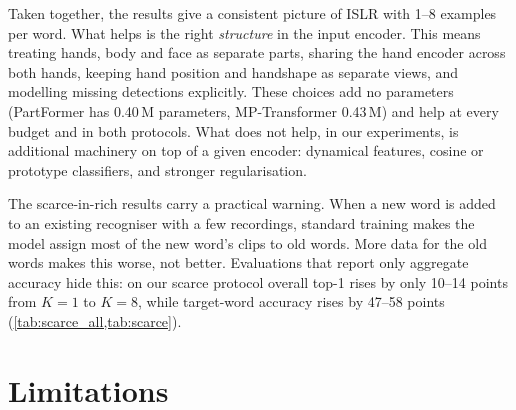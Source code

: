 \documentclass[11pt]{article}
\begin{document}
Taken together, the results give a consistent picture of ISLR with 1--8 examples per word.
What helps is the right \emph{structure} in the input encoder. This means treating hands,
body and face as separate parts, sharing the hand encoder across both hands, keeping hand
position and handshape as separate views, and modelling missing detections explicitly. These
choices add no parameters (PartFormer has 0.40\,M parameters, MP-Transformer 0.43\,M) and help
at every budget and in both protocols. What does not help, in our experiments, is additional
machinery on top of a given encoder: dynamical features, cosine or prototype classifiers,
and stronger regularisation.

The scarce-in-rich results carry a practical warning. When a new word is added to an
existing recogniser with a few recordings, standard training makes the model assign most of
the new word's clips to old words. More data for the old words makes this worse, not better.
Evaluations that report only aggregate accuracy hide this: on our scarce protocol overall
top-1 rises by only 10--14 points from $K{=}1$ to $K{=}8$, while target-word accuracy rises
by 47--58 points (\cref{tab:scarce_all,tab:scarce}).

\section{Limitations}\label{sec:limits}
\end{document}
